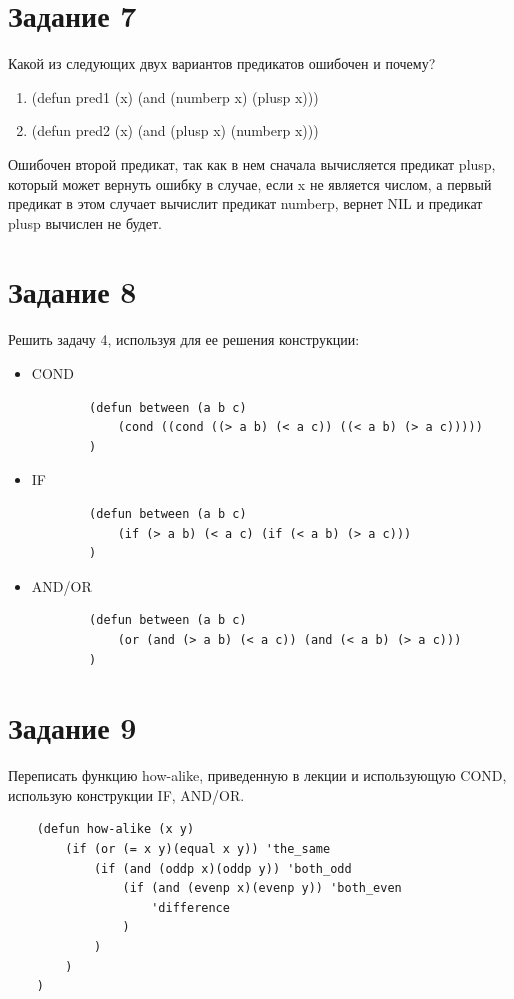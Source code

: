 \documentclass[a4paper, 12pt]{article}
\begin{document}
\section*{Задание 7}
Какой из следующих двух вариантов предикатов ошибочен и почему?\\

\begin{enumerate}
	\item (defun pred1 (x) (and (numberp x) (plusp x)))
	\item (defun pred2 (x) (and (plusp x) (numberp x)))
\end{enumerate} 

Ошибочен второй предикат, так как в нем сначала вычисляется предикат plusp, который может вернуть ошибку в случае, если x не является числом, а первый предикат в этом случает вычислит предикат numberp, вернет NIL и предикат plusp вычислен не будет.\\


\section*{Задание 8}
Решить задачу 4, используя для ее решения конструкции:\\

\begin{itemize}
	\item COND\\
	\begin{lstlisting}
		(defun between (a b c) 
			(cond ((cond ((> a b) (< a c)) ((< a b) (> a c)))))
		)
	\end{lstlisting}
	\item IF\\
	\begin{lstlisting}
		(defun between (a b c) 
			(if (> a b) (< a c) (if (< a b) (> a c)))
		)
	\end{lstlisting}
	
	\item AND/OR\\
	\begin{lstlisting}
		(defun between (a b c) 
			(or (and (> a b) (< a c)) (and (< a b) (> a c)))
		)
	\end{lstlisting}
\end{itemize}

\section*{Задание 9}
Переписать функцию how-alike, приведенную в лекции и использующую COND, использую конструкции IF, AND/OR.\\
\begin{lstlisting}
	(defun how-alike (x y) 
		(if (or (= x y)(equal x y)) 'the_same
			(if (and (oddp x)(oddp y)) 'both_odd
				(if (and (evenp x)(evenp y)) 'both_even
					'difference
				)
			)
		)
	)
\end{lstlisting}
\end{document}
